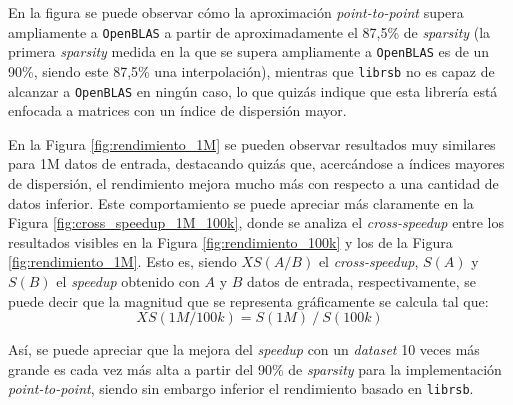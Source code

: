 En la figura se puede observar cómo la aproximación \textit{point-to-point} supera ampliamente a \texttt{OpenBLAS} a partir de aproximadamente el 87,5\% de \textit{sparsity} (la primera \textit{sparsity} medida en la que se supera ampliamente a \texttt{OpenBLAS} es de un 90\%, siendo este 87,5\% una interpolación), mientras que \texttt{librsb} no es capaz de alcanzar a \texttt{OpenBLAS} en ningún caso, lo que quizás indique que esta librería está enfocada a matrices con un índice de dispersión mayor.

En la Figura \ref{fig:rendimiento_1M} se pueden observar resultados muy similares para 1M datos de entrada, destacando quizás que, acercándose a índices mayores de dispersión, el rendimiento mejora mucho más con respecto a una cantidad de datos inferior. Este comportamiento se puede apreciar más claramente en la Figura \ref{fig:cross_speedup_1M_100k}, donde se analiza el \textit{cross-speedup} entre los resultados visibles en la Figura \ref{fig:rendimiento_100k} y los de la Figura \ref{fig:rendimiento_1M}. Esto es, siendo $XS(A/B)$ el \textit{cross-speedup}, $S(A)$ y $S(B)$ el \textit{speedup} obtenido con $A$ y $B$ datos de entrada, respectivamente, se puede decir que la magnitud que se representa gráficamente se calcula tal que:
\begin{equation}
    XS(1M/100k) = S(1M)\: /\: S(100k)\nonumber
    \label{eq:cross_speedup}
\end{equation}

Así, se puede apreciar que la mejora del \textit{speedup} con un \textit{dataset} 10 veces más grande es cada vez más alta a partir del 90\% de \textit{sparsity} para la implementación \textit{point-to-point}, siendo sin embargo inferior el rendimiento basado en \texttt{librsb}.

